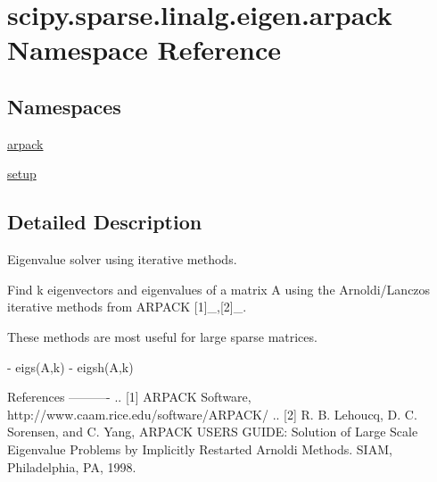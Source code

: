 \hypertarget{namespacescipy_1_1sparse_1_1linalg_1_1eigen_1_1arpack}{}\section{scipy.\+sparse.\+linalg.\+eigen.\+arpack Namespace Reference}
\label{namespacescipy_1_1sparse_1_1linalg_1_1eigen_1_1arpack}
\subsection*{Namespaces}
\begin{DoxyCompactItemize}
\item 
 \hyperlink{namespacescipy_1_1sparse_1_1linalg_1_1eigen_1_1arpack_1_1arpack}{arpack}
\item 
 \hyperlink{namespacescipy_1_1sparse_1_1linalg_1_1eigen_1_1arpack_1_1setup}{setup}
\end{DoxyCompactItemize}


\subsection{Detailed Description}
\begin{DoxyVerb}Eigenvalue solver using iterative methods.

Find k eigenvectors and eigenvalues of a matrix A using the
Arnoldi/Lanczos iterative methods from ARPACK [1]_,[2]_.

These methods are most useful for large sparse matrices.

  - eigs(A,k)
  - eigsh(A,k)

References
----------
.. [1] ARPACK Software, http://www.caam.rice.edu/software/ARPACK/
.. [2] R. B. Lehoucq, D. C. Sorensen, and C. Yang,  ARPACK USERS GUIDE:
   Solution of Large Scale Eigenvalue Problems by Implicitly Restarted
   Arnoldi Methods. SIAM, Philadelphia, PA, 1998.\end{DoxyVerb}
 